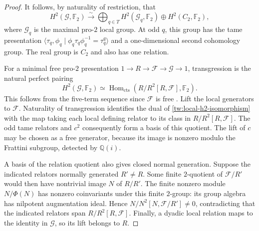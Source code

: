 \begin{proof}
It follows, by naturality of restriction, that
\begin{equation}\label{tw:local-h2-isomorphism}
 H^2(\mathcal G,\mathbb F_2)
 \xrightarrow{\ \sim\ }
 \bigoplus_{q\in T}H^2(\mathcal G_q,\mathbb F_2)
 \oplus H^2(C_2,\mathbb F_2),
\end{equation}
where $\mathcal G_q$ is the maximal pro-$2$ local group.
At odd $q$, this group has the tame presentation
$\langle\tau_q,\phi_q\mid
\phi_q\tau_q\phi_q^{-1}=\tau_q^q\rangle$ and a one-dimensional second
cohomology group.  The real group is $C_2$ and also has one relation.

For a minimal free pro-$2$ presentation
$1\to R\to\mathcal F\to\mathcal G\to1$, transgression is the
natural perfect pairing
\[
 H^2(\mathcal G,\mathbb F_2)
 \simeq\operatorname{Hom}_{\mathrm{cts}}
       (R/R^2[R,\mathcal F],\mathbb F_2).
\]
This follows from the five-term sequence since $\mathcal F$ is free
\cite[(3.3)--(3.4)]{Quadrelli2021}.
Lift the local generators to $\mathcal F$.  Naturality of transgression
identifies the dual of \eqref{tw:local-h2-isomorphism} with the map taking
each local defining relator to its class in $R/R^2[R,\mathcal F]$.
The odd tame relators and $c^2$ consequently form a basis of this quotient.
The lift of $c$ may be chosen as a free generator, because its image is
nonzero modulo the Frattini subgroup, detected by $\mathbb Q(i)$.

A basis of the relation quotient also gives closed normal generation.
Suppose the indicated relators normally generated $R'\ne R$.
Some finite $2$-quotient of $\mathcal F/R'$ would then have nontrivial image
$N$ of $R/R'$.  The finite nonzero module $N/\Phi(N)$ has nonzero
coinvariants under this finite $2$-group: its group algebra has nilpotent
augmentation ideal.  Hence $N/N^2[N,\mathcal F/R']\ne0$, contradicting
that the indicated relators span $R/R^2[R,\mathcal F]$.
Finally, a dyadic local relation maps to the identity in
$\mathcal G$, so its lift belongs to $R$.
\end{proof}

